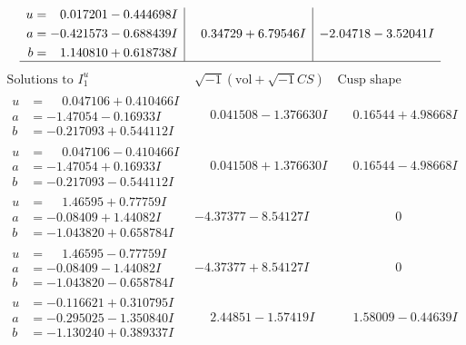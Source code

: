 \documentclass[1p]{elsarticle_modified}
\theoremstyle{definition}
\newcommand{\I}{\sqrt{-1}}
\begin{document}
$$\begin{array}{c|c|c}
\begin{aligned}
u &= \phantom{-}0.017201 - 0.444698 I \\
a &= -0.421573 - 0.688439 I \\
b &= \phantom{-}1.140810 + 0.618738 I\end{aligned}
 & \phantom{-}0.34729 + 6.79546 I & -2.04718 - 3.52041 I\\
 \hline 
 \end{array}$$\newpage$$\begin{array}{c|c|c}  
\text{Solutions to }I^u_{1}& \I (\text{vol} + \sqrt{-1}CS) & \text{Cusp shape}\\
 \hline 
\begin{aligned}
u &= \phantom{-}0.047106 + 0.410466 I \\
a &= -1.47054 - 0.16933 I \\
b &= -0.217093 + 0.544112 I\end{aligned}
 & \phantom{-}0.041508 - 1.376630 I & \phantom{-}0.16544 + 4.98668 I \\ \hline\begin{aligned}
u &= \phantom{-}0.047106 - 0.410466 I \\
a &= -1.47054 + 0.16933 I \\
b &= -0.217093 - 0.544112 I\end{aligned}
 & \phantom{-}0.041508 + 1.376630 I & \phantom{-}0.16544 - 4.98668 I \\ \hline\begin{aligned}
u &= \phantom{-}1.46595 + 0.77759 I \\
a &= -0.08409 + 1.44082 I \\
b &= -1.043820 + 0.658784 I\end{aligned}
 & -4.37377 - 8.54127 I & \phantom{-0.000000 } 0 \\ \hline\begin{aligned}
u &= \phantom{-}1.46595 - 0.77759 I \\
a &= -0.08409 - 1.44082 I \\
b &= -1.043820 - 0.658784 I\end{aligned}
 & -4.37377 + 8.54127 I & \phantom{-0.000000 } 0 \\ \hline\begin{aligned}
u &= -0.116621 + 0.310795 I \\
a &= -0.295025 - 1.350840 I \\
b &= -1.130240 + 0.389337 I\end{aligned}
 & \phantom{-}2.44851 - 1.57419 I & \phantom{-}1.58009 - 0.44639 I \\ \hline\begin{aligned}

\end{aligned}
\end{array}$$
\end{document}
